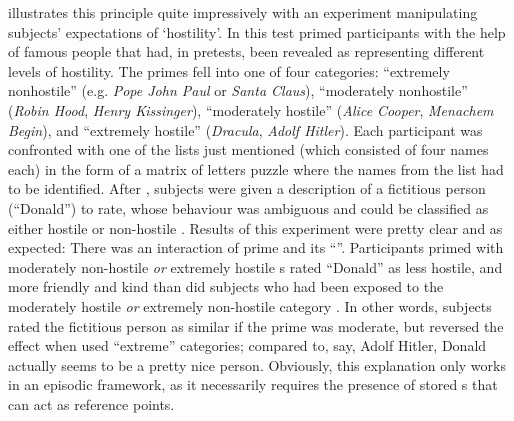 \citeauthor{herr1986} illustrates this principle quite impressively with an experiment manipulating subjects' expectations of `hostility'.
In this test \citeauthor{herr1986} primed participants with the help of famous people that had, in pretests, been revealed as representing different levels of hostility.
The primes fell into one of four categories: ``extremely nonhostile'' (e.g. \emph{Pope John Paul} or \emph{Santa Claus}), ``moderately nonhostile'' (\emph{Robin Hood}, \emph{Henry Kissinger}), ``moderately hostile'' (\emph{Alice Cooper}, \emph{Menachem Begin}), and ``extremely hostile'' (\emph{Dracula}, \emph{Adolf Hitler}).
Each participant was confronted with one of the lists just mentioned (which consisted of four names each) in the form of a matrix of letters puzzle where the names from the list had to be identified.
After , subjects were given a description of a fictitious person (``Donald'') to rate, whose behaviour was ambiguous and could be classified as either hostile or non-hostile \parencite[cf.][1108]{herr1986}.
Results of this experiment were pretty clear and as expected: There was an interaction of prime and its ``''.
Participants primed with moderately non-hostile \emph{or} extremely hostile s rated ``Donald'' as less hostile, and more friendly and kind than did subjects who had been exposed to the moderately hostile \emph{or} extremely non-hostile category \parencite[cf.][1109]{herr1986}.
In other words, subjects rated the fictitious person as similar if the prime was moderate, but reversed the effect when  used ``extreme'' categories; compared to, say, Adolf Hitler, Donald actually seems to be a pretty nice person.
Obviously, this explanation only works in an episodic framework, as it necessarily requires the presence of stored s that can act as reference points.

